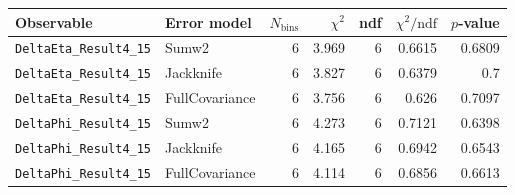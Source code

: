 \begin{tabular}{|l|l|r|r|r|r|r|}
\hline
Observable & Error model & $N_{\mathrm{bins}}$ & $\chi^2$ & ndf & $\chi^2/\mathrm{ndf}$ & $p$-value \\
\hline
\texttt{DeltaEta\_Result4\_15} & Sumw2 & 6 & 3.969 & 6 & 0.6615 & 0.6809 \\
\texttt{DeltaEta\_Result4\_15} & Jackknife & 6 & 3.827 & 6 & 0.6379 & 0.7 \\
\texttt{DeltaEta\_Result4\_15} & FullCovariance & 6 & 3.756 & 6 & 0.626 & 0.7097 \\
\texttt{DeltaPhi\_Result4\_15} & Sumw2 & 6 & 4.273 & 6 & 0.7121 & 0.6398 \\
\texttt{DeltaPhi\_Result4\_15} & Jackknife & 6 & 4.165 & 6 & 0.6942 & 0.6543 \\
\texttt{DeltaPhi\_Result4\_15} & FullCovariance & 6 & 4.114 & 6 & 0.6856 & 0.6613 \\
\hline
\end{tabular}
